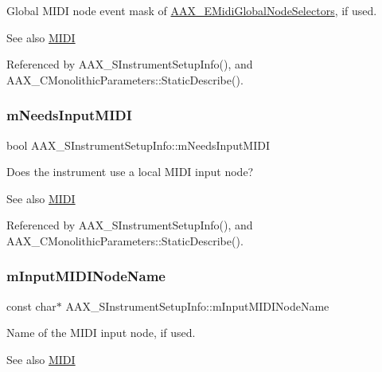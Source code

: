 Global M\+I\+DI node event mask of \mbox{\hyperlink{a00491_a349dae6bc64bda67a5440cbc6637f92d}{A\+A\+X\+\_\+\+E\+Midi\+Global\+Node\+Selectors}}, if used. 

\begin{DoxySeeAlso}{See also}
\mbox{\hyperlink{a00806}{M\+I\+DI}} 
\end{DoxySeeAlso}


Referenced by A\+A\+X\+\_\+\+S\+Instrument\+Setup\+Info(), and A\+A\+X\+\_\+\+C\+Monolithic\+Parameters\+::\+Static\+Describe().

\mbox{\label{a01957_a69f737db7dfa0c8362a0b368dc3e19e9}} 
\subsubsection{\texorpdfstring{mNeedsInputMIDI}{mNeedsInputMIDI}}
{\footnotesize\ttfamily bool A\+A\+X\+\_\+\+S\+Instrument\+Setup\+Info\+::m\+Needs\+Input\+M\+I\+DI}



Does the instrument use a local M\+I\+DI input node? 

\begin{DoxySeeAlso}{See also}
\mbox{\hyperlink{a00806}{M\+I\+DI}} 
\end{DoxySeeAlso}


Referenced by A\+A\+X\+\_\+\+S\+Instrument\+Setup\+Info(), and A\+A\+X\+\_\+\+C\+Monolithic\+Parameters\+::\+Static\+Describe().

\mbox{\label{a01957_ac9206c672bf45367ae0987b6adafb736}} 
\subsubsection{\texorpdfstring{mInputMIDINodeName}{mInputMIDINodeName}}
{\footnotesize\ttfamily const char$\ast$ A\+A\+X\+\_\+\+S\+Instrument\+Setup\+Info\+::m\+Input\+M\+I\+D\+I\+Node\+Name}



Name of the M\+I\+DI input node, if used. 

\begin{DoxySeeAlso}{See also}
\mbox{\hyperlink{a00806}{M\+I\+DI}} 
\end{DoxySeeAlso}



